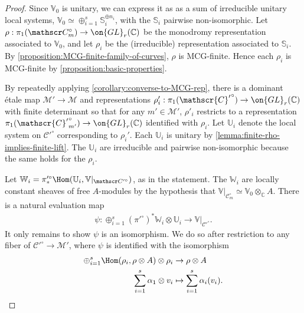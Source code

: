 \begin{proof}
Since $\mathbb V_0$ is unitary, we can express it as
as a sum of irreducible unitary local systems,
$\mathbb V_0 \simeq \oplus_{i=1}^s \mathbb
S_i^{\oplus n_i}$, with the $\mathbb{S}_i$ pairwise non-isomorphic.
Let $\rho:\pi_1(\mathscr C_m^\circ) \to \on{GL}_r(\mathbb C)$ be the monodromy representation associated to $\mathbb{V}_0$, and let
$\rho_i$ be the (irreducible) representation associated to $\mathbb{S}_i$.
By \autoref{proposition:MCG-finite-family-of-curves}, $\rho$ is MCG-finite. Hence each
$\rho_i$ is MCG-finite by \autoref{proposition:basic-properties}.

By repeatedly applying \autoref{corollary:converse-to-MCG-rep},
there is a dominant \'etale map $\mathscr M' \to \mathscr M$ and representations
$\rho'_i: \pi_1({\mathscr {C}'}^\circ) \to \on{GL}_r(\mathbb C)$ with finite determinant so that for any $m' \in \mathscr
M'$, $\rho'_i$ restricts to a representation
$\pi_1({\mathscr{C}'}^\circ_{m'}) \to \on{GL}_r(\mathbb C)$
identified with $\rho_i$.
Let $\mathbb U_i$ denote the local system on ${\mathscr{C}'}^\circ$ corresponding to
$\rho_i'$.
Each $\mathbb U_i$ is unitary by \autoref{lemma:finite-rho-implies-finite-lift}.
The $\mathbb{U}_i$
are irreducible and pairwise non-isomorphic
because the same holds for the $\rho_i$.

Let $\mathbb W_i = \pi'^\circ_*\Hom(\mathbb U_i, \mathbb V|_{\mathscr
C'^\circ})$, as in the statement. The $\mathbb{W}_i$ are locally constant sheaves of free $A$-modules by the hypothesis that $\mathbb V|_{\mathscr C^\circ_m}\simeq \mathbb{V}_0\otimes_\mathbb{C} A$. There is a natural evaluation map
\begin{align*}
	\psi: \oplus_{i=1}^s (\pi'^\circ)^* \mathbb W_i \otimes \mathbb U_i \to \mathbb
	V|_{{\mathscr{C}'}^\circ}.
\end{align*}
It only remains to show $\psi$ is an isomorphism.
We do so after restriction to any fiber
of $\mathscr C'^\circ \to \mathscr M'$, where $\psi$ is identified with the
isomorphism
\begin{align}
	\nonumber
	\oplus_{i=1}^s \Hom(\rho_i, \rho\otimes A) \otimes \rho_i  & \rightarrow \rho\otimes A\\
	\sum_{i=1}^s \alpha_1 \otimes v_i & \mapsto \sum_{i=1}^s \alpha_i(v_i).
	\qedhere
\end{align}
\end{proof}
